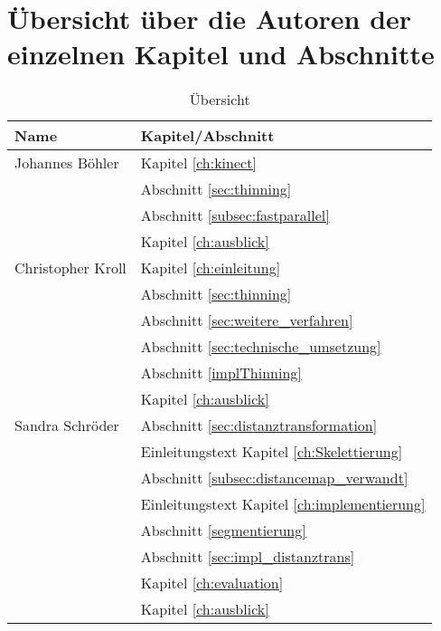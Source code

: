 \chapter{Übersicht über die Autoren der einzelnen Kapitel und Abschnitte}
\begin{table}[htbp]
\begin{center}
\begin{tabular}{|l|l|}
\hline 
\textbf{Name} & \textbf{Kapitel/Abschnitt}\\
\hline Johannes Böhler & Kapitel \ref{ch:kinect}\\
 & Abschnitt \ref{sec:thinning}\\
 & Abschnitt \ref{subsec:fastparallel} \\ 
 &  Kapitel \ref{ch:ausblick}\\
\hline Christopher Kroll &  Kapitel \ref{ch:einleitung} \\
&  Abschnitt \ref{sec:thinning} \\
&  Abschnitt \ref{sec:weitere_verfahren} \\
&  Abschnitt \ref{sec:technische_umsetzung} \\
&  Abschnitt \ref{implThinning} \\ 
&  Kapitel \ref{ch:ausblick} \\
\hline Sandra Schröder &  Abschnitt \ref{sec:distanztransformation}\\
& Einleitungstext Kapitel \ref{ch:Skelettierung} \\
&  Abschnitt \ref{subsec:distancemap_verwandt} \\
& Einleitungstext Kapitel \ref{ch:implementierung}\\
& Abschnitt \ref{segmentierung}\\
& Abschnitt \ref{sec:impl_distanztrans} \\
& Kapitel \ref{ch:evaluation} \\
&  Kapitel \ref{ch:ausblick}\\
\hline
\end{tabular} 
\end{center}
\caption{Übersicht}
\end{table}